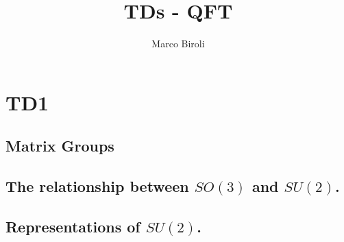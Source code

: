 \documentclass[10pt,a4paper]{book}
\author{Marco Biroli}
\title{TDs - QFT}
\begin{document}
\maketitle
\chapter{TD1}
\section{Matrix Groups}
\section{The relationship between $SO(3)$ and $SU(2)$.}
\section{Representations of $SU(2)$.}
\end{document}
